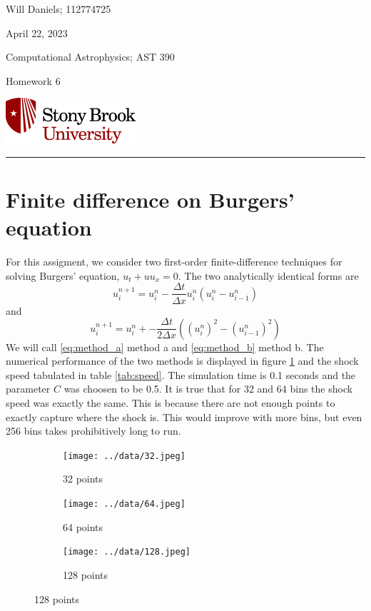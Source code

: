 \documentclass[12pt, letterpaper]{article}
\begin{document}
\noindent
\begin{minipage}{0.5\textwidth}
    Will Daniels; 112774725

    April 22, 2023

    Computational Astrophysics; AST 390

    Homework 6
\end{minipage}
%
\begin{minipage}{0.5\textwidth}
    \begin{flushright}
        \includegraphics[height = 48pt]{../../LatexAssets/SBULogoStacked}
    \end{flushright}
\end{minipage}
\noindent
\rule{\textwidth}{1pt}

\section{Finite difference on Burgers' equation}

For this assigment, we consider two first-order finite-difference techniques for
solving Burgers' equation, \( u_t + u u_x = 0 \). The two analytically identical
forms are
\begin{equation}
  u_i^{n+1} = u_i^n -
  \frac{\Delta t}{\Delta x} u_i^n \left( u_i^n - u_{i-1}^n \right)
  \label{eq:method_a}
\end{equation}
and
\begin{equation}
  u_i^{n+1} = u_i^n + -
  \frac{\Delta t}{2 \Delta x} \left(
    \left( u_i^n \right)^2 - \left( u_{i-1}^n \right)^2
    \label{eq:method_b}
  \right)
\end{equation}
We will call \eqref{eq:method_a} method a and \eqref{eq:method_b} method b. The
numerical performance of the two methods is displayed in figure \ref{fig:plots}
and the shock speed tabulated in table \ref{tab:speed}. The simulation time is
0.1 seconds and the parameter \(C\) was choosen to be 0.5. It is true that for
32 and 64 bins the shock speed was exactly the same. This is because there are
not enough points to exactly capture where the shock is. This would improve with
more bins, but even 256 bins takes prohibitively long to run.

\begin{figure} [!b]
  \centering
  \caption{Plots at various number of points}
  \begin{subfigure}{0.3\textwidth}
    \centering
    \caption{32 points}
    \texttt{[image: ../data/32.jpeg]}
  \end{subfigure} \hfill \begin{subfigure}{0.3\textwidth}
    \centering
    \caption{64 points}
    \texttt{[image: ../data/64.jpeg]}
  \end{subfigure} \hfill \begin{subfigure}{0.3\textwidth}
    \centering
    \caption{128 points}
    \texttt{[image: ../data/128.jpeg]}
  \end{subfigure}
  \label{fig:plots}
\end{figure}
\end{document}

